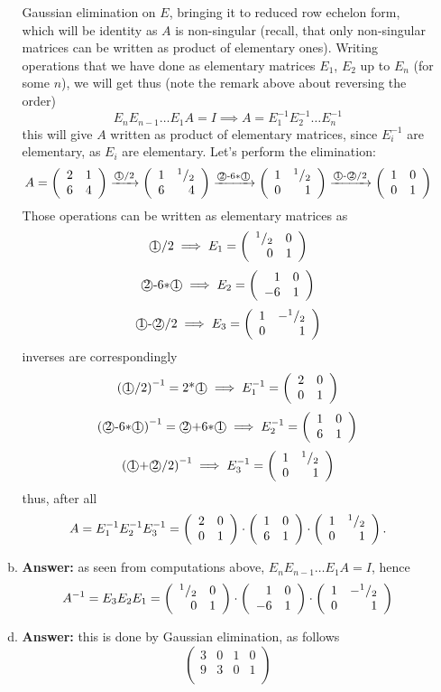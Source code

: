 \documentclass[8pt]{article} %
\begin{document}
\begin{enumerate}[1]
\begin{enumerate}[(a)]
				Gaussian elimination on $E$, bringing it to reduced row echelon form, which will be identity as $A$
				is non-singular (recall, that only non-singular matrices can be written
				as product of elementary ones). Writing operations that we
				have done as elementary matrices $E_1$, $E_2$ up to $E_n$ (for some $n$), we will get thus
				(note the remark above about reversing the order)
				\[E_nE_{n-1}\hdots E_1A=I\implies A=E_1^{-1}E_2^{-1}\hdots E_n^{-1}\]
				this will give $A$ written as product of elementary matrices, since $E_i^{-1}$ are elementary,
				as $E_i$ are elementary. Let's perform the elimination:
				\[A=\left(\begin{array}{rr}2&1\\6&4\end{array}\right)\xrightarrow{\text{\textcircled{1}$/2$}}
				\left(\begin{array}{rr}1&{^{1}/_{2}}\\6&4\end{array}\right)
				\xrightarrow{\text{\textcircled{2}-$6*$\textcircled{1}}}\left(\begin{array}{rr}1&{^{1}/_{2}}\\0&1\end{array}\right)
				\xrightarrow{\text{\textcircled{1}-\textcircled{2}$/2$}}\left(\begin{array}{rr}1&0\\0&1\end{array}\right)
				\]
				Those operations can be written as elementary matrices as
				\[{\text{\textcircled{1}$/2$}}\implies E_1=\left(\begin{array}{rr}{^{1}/_{2}}&0\\0&1\end{array}\right)\]
				\[{\text{\textcircled{2}-$6*$\textcircled{1}}}\implies E_2=\left(\begin{array}{rr}1&0\\-6&1\end{array}\right)\]
				\[{\text{\textcircled{1}-\textcircled{2}$/2$}}\implies E_3=\left(\begin{array}{rr}1&-{^{1}/_{2}}\\0&1\end{array}\right)\]
				inverses are correspondingly
				\[\left(\text{\textcircled{1}$/2$}\right)^{-1}={\text{2*\textcircled{1}}}
				\implies E_1^{-1}=\left(\begin{array}{rr}2&0\\0&1\end{array}\right)\]
				\[\left(\text{\textcircled{2}-$6*$\textcircled{1}}\right)^{-1}={\text{\textcircled{2}+$6*$\textcircled{1}}}
				\implies E_2^{-1}=\left(\begin{array}{rr}1&0\\6&1\end{array}\right)\]
				\[{\left(\text{\textcircled{1}+\textcircled{2}$/2$}\right)}^{-1}\implies 
					E_3^{-1}=\left(\begin{array}{rr}1&{^{1}/_{2}}\\0&1\end{array}\right)\]
				thus, after all
				\[A=E_1^{-1}E_2^{-1}E_3^{-1}=\left(\begin{array}{rr}2&0\\0&1\end{array}\right)\cdot\left(\begin{array}{rr}1&0\\6&1\end{array}\right)\cdot
				\left(\begin{array}{rr}1&{^{1}/_{2}}\\0&1\end{array}\right).\]
			\item {\bf Answer: }as seen from computations above, $E_nE_{n-1}\hdots E_1A=I$, hence
				\[A^{-1}=E_3E_2E_1=\left(\begin{array}{rr}{^{1}/_{2}}&0\\0&1\end{array}\right)\cdot\left(\begin{array}{rr}1&0\\-6&1\end{array}\right)\cdot
				\left(\begin{array}{rr}1&-{^{1}/_{2}}\\0&1\end{array}\right)\]
		\end{enumerate}
	\setcounter{enumi}{9}
		\begin{enumerate}[(a)]
			\setcounter{enumi}{3}
			\item{\bf Answer: }this is done by Gaussian elimination, as follows
				\[\left(\begin{array}{rr|rr}
					3&0&1&0\\
					9&3&0&1\\
				\end{array}\right)
\]
\end{enumerate}
\end{enumerate}
\end{document}
